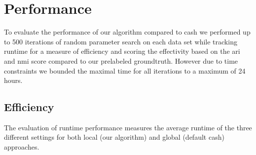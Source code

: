 \begin{figure}
\begin{minipage}[t]{.5\textwidth}
    \label{fig:my_label}
    \end{minipage}%
\end{figure}


\section{Performance}
 To evaluate the performance of our algorithm compared to \gls{cash} we performed up to 500 iterations of random parameter search on each data set while tracking runtime for a measure of efficiency and scoring the effectivity based on the \gls{ari} and \gls{nmi} score compared to our prelabeled groundtruth. However due to time constraints we bounded the maximal time for all iterations to a maximum of 24 hours. 
 
\begin{table}[]
\centering
{}
\caption{}
\label{tab:reducedsetup}
\end{table}
 
\subsection{Efficiency}
 The evaluation of runtime performance measures the average runtime of the three different settings for both local (our algorithm) and global (default \gls{cash}) approaches. 
 
